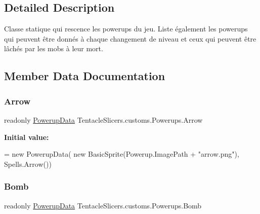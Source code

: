 \subsection{Detailed Description}
Classe statique qui rescence les powerups du jeu. Liste également les powerups qui peuvent être donnés à chaque changement de niveau et ceux qui peuvent être lâchés par les mobs à leur mort. 



\subsection{Member Data Documentation}
\mbox{\label{class_tentacle_slicers_1_1customs_1_1_powerups_a09e7883f369dd9b6116370ecb107b6c0}} 
\subsubsection{\texorpdfstring{Arrow}{Arrow}}
{\footnotesize\ttfamily readonly \hyperlink{class_tentacle_slicers_1_1actors_1_1_powerup_data}{Powerup\+Data} Tentacle\+Slicers.\+customs.\+Powerups.\+Arrow\hspace{0.3cm}{\ttfamily [static]}}

{\bfseries Initial value\+:}
\begin{DoxyCode}
= \textcolor{keyword}{new} PowerupData(
            \textcolor{keyword}{new} BasicSprite(Powerup.ImagePath + \textcolor{stringliteral}{"arrow.png"}), Spells.Arrow())
\end{DoxyCode}
\mbox{\label{class_tentacle_slicers_1_1customs_1_1_powerups_a1cecb241e56a5b01d57a409bb423dd85}} 
\subsubsection{\texorpdfstring{Bomb}{Bomb}}
{\footnotesize\ttfamily readonly \hyperlink{class_tentacle_slicers_1_1actors_1_1_powerup_data}{Powerup\+Data} Tentacle\+Slicers.\+customs.\+Powerups.\+Bomb\hspace{0.3cm}{\ttfamily [static]}}

